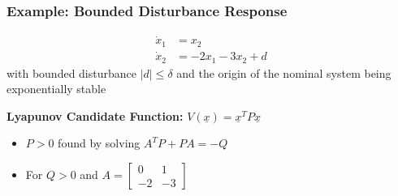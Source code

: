 \documentclass[student, noshadow, lsr, english, aspectratio=169, t]{ITR_LSR_slides}
\begin{document}
\begin{frame}
    \frametitle{Example: Bounded Disturbance Response}
	\vspace{-0.5cm}
    \begin{tcolorbox}[title=Problem: Analyze Boundedness of a Perturbed Mass-Spring-Damper-System]
		\vspace{-0.4cm}
        \begin{align*}
            \dot{x}_1 &= x_2 \\ %
            \dot{x}_2 &= -2x_1 - 3x_2 + d
        \end{align*}
        with bounded disturbance $|d| \leq \delta$ and the origin of the nominal system being exponentially stable
    \end{tcolorbox}

    \vspace{0.3cm}
    \textbf{Lyapunov Candidate Function:} $V(\underline{x}) = \underline{x}^T P \underline{x}$
    \begin{itemize}
        \item $P > 0$ found by solving $A^T P + P A = -Q$
        \vspace{0.2cm}
        \item For $Q>0$ and $A = \begin{bmatrix} 0 & 1 \\ -2 & -3 \end{bmatrix}$
    \end{itemize}

\end{frame}
\end{document}

